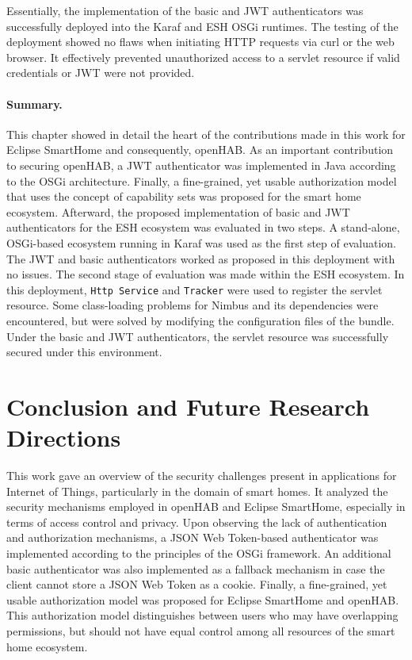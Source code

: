 \documentclass[12pt]{article}
\begin{document}
Essentially, the implementation of the basic and JWT authenticators was successfully deployed into the Karaf and ESH OSGi runtimes. The testing of the deployment showed no flaws when initiating HTTP requests via curl or the web browser. It effectively prevented unauthorized access to a servlet resource if valid credentials or JWT were not provided.

\paragraph{Summary.} This chapter showed in detail the heart of the contributions made in this work for Eclipse SmartHome and consequently, openHAB. As an important contribution to securing openHAB, a JWT authenticator was implemented in Java according to the OSGi architecture. Finally, a fine-grained, yet usable authorization model that uses the concept of capability sets was proposed for the smart home ecosystem. Afterward, the proposed implementation of basic and JWT authenticators for the ESH ecosystem was evaluated in two steps. A stand-alone, OSGi-based ecosystem running in Karaf was used as the first step of evaluation. The JWT and basic authenticators worked as proposed in this deployment with no issues. The second stage of evaluation was made within the ESH ecosystem. In this deployment, \texttt{Http Service} and \texttt{Tracker} were used to register the servlet resource. Some class-loading problems for Nimbus and its dependencies were encountered, but were solved by modifying the configuration files of the bundle. Under the basic and JWT authenticators, the servlet resource was successfully secured under this environment.

\newpage
\section{Conclusion and Future Research Directions}
\label{sec:conclusion}
This work gave an overview of the security challenges present in applications for Internet of Things, particularly in the domain of smart homes. It analyzed the security mechanisms employed in openHAB and Eclipse SmartHome, especially in terms of access control and privacy. Upon observing the lack of authentication and authorization mechanisms, a JSON Web Token-based authenticator was implemented according to the principles of the OSGi framework. An additional basic authenticator was also implemented as a fallback mechanism in case the client cannot store a JSON Web Token as a cookie. Finally, a fine-grained, yet usable authorization model was proposed for Eclipse SmartHome and openHAB. This authorization model distinguishes between users who may have overlapping permissions, but should not have equal control among all resources of the smart home ecosystem.
\end{document}
